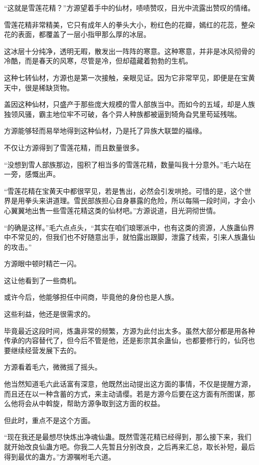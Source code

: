 
\begin{this_body}

“这就是雪莲花精？”方源望着手中的仙材，啧啧赞叹，目光中流露出赞叹的情绪。

雪莲花精非常精美，它只有成年人的拳头大小，粉红色的花瓣，嫣红的花蕊，整朵花的表面，都覆盖了一层小指甲那么厚的冰层。

这冰层十分纯净，透明无暇，散发出一阵阵的寒意。这种寒意，并非是冰风彻骨的冷酷，而是春天的风寒，尽管是冷，但却蕴藏着勃勃的生机。

这种七转仙材，方源也是第一次接触，亲眼见证。因为它非常罕见，即便是在宝黄天中，很是稀缺货物。

盖因这种仙材，只盛产于那些庞大规模的雪人部族当中。而如今的五域，却是人族独领风骚，霸主地位牢不可破，各个异人种族都被逼到犄角旮旯里苟延残喘。

方源能够轻而易举地得到这种仙材，乃是托了异族大联盟的福缘。

不仅让方源得到了雪莲花精，而且数量很多。

“没想到雪人部族那边，囤积了相当多的雪莲花精，数量叫我十分意外。”毛六站在一旁，感慨出声。

“雪莲花精在宝黄天中都很罕见，若是售出，必然会引发哄抢。可惜的是，这个世界是用拳头来讲道理。雪民部族担心自身暴露的危险，所以每隔一段时间，才会小心翼翼地出售一些雪莲花精这类的仙材吧。”方源说道，目光洞彻世情。

“的确是这样。”毛六点点头，“其实在咱们琅琊派中，也有这类的资源，人族蛊仙界中不常见的，但我们也不好随意出手，就怕露出跟脚，泄露了线索，引来人族蛊仙的攻击。”

方源眼中顿时精芒一闪。

这让他看到了一些商机。

或许今后，他能够担任中间商，毕竟他的身份也是人族。

这些利益，他还是很需求的。

毕竟最近这段时间，炼蛊非常的频繁，方源为此付出太多。虽然大部分都是用各种传承的内容替代了，但今后不管是他，还是影宗其余蛊仙，也都要修行的，仙窍也要继续经营发展下去的。

方源看着毛六，微微摇了摇头。

他当然知道毛六此话富有深意，他既然出动提出这方面的事情，不仅是提醒方源，而且还在以一种含蓄的方式，来主动请缨。若是方源今后要在这方面有所图谋，那么他将会从中斡旋，帮助方源争取到这方面的权益。

但此时，重点不是这个方面。

“现在我还是最想尽快炼出净魂仙蛊。既然雪莲花精已经得到，那么接下来，我们就开始改良仙蛊方吧。你我二人先暂且分别改良，之后再来汇总，取长补短，最后得到最优的蛊方。”方源嘱咐毛六道。


\end{this_body}
